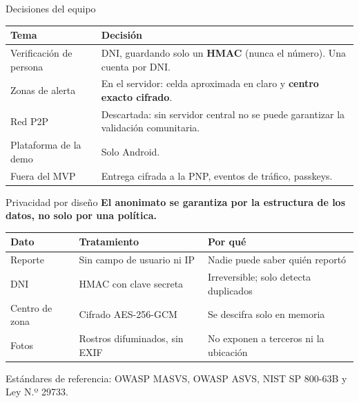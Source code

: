 \documentclass[aspectratio=169,10pt]{beamer}
\begin{document}
\begin{frame}{Decisiones del equipo}
  \begin{table}
    \small
    \begin{tabular}{p{}p{}}
      \toprule
      \textbf{Tema} & \textbf{Decisión} \\
      \midrule
      Verificación de persona & DNI, guardando solo un \textbf{HMAC} (nunca el número). Una cuenta por DNI. \\
      Zonas de alerta & En el servidor: celda aproximada en claro y \textbf{centro exacto cifrado}. \\
      Red P2P & Descartada: sin servidor central no se puede garantizar la validación comunitaria. \\
      Plataforma de la demo & Solo Android. \\
      Fuera del MVP & Entrega cifrada a la PNP, eventos de tráfico, passkeys. \\
      \bottomrule
    \end{tabular}
  \end{table}
\end{frame}

\begin{frame}{Privacidad por diseño}
  \textbf{El anonimato se garantiza por la estructura de los datos, no solo por una política.}
  \vspace{0.5em}
  \begin{table}
    \small
    \begin{tabular}{lll}
      \toprule
      \textbf{Dato} & \textbf{Tratamiento} & \textbf{Por qué} \\
      \midrule
      Reporte & Sin campo de usuario ni IP & Nadie puede saber quién reportó \\
      DNI & HMAC con clave secreta & Irreversible; solo detecta duplicados \\
      Centro de zona & Cifrado AES-256-GCM & Se descifra solo en memoria \\
      Fotos & Rostros difuminados, sin EXIF & No exponen a terceros ni la ubicación \\
      \bottomrule
    \end{tabular}
  \end{table}
  \vfill
  \small Estándares de referencia: OWASP MASVS, OWASP ASVS, NIST SP 800-63B y Ley N.º 29733.
\end{frame}
\end{document}
